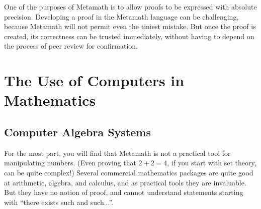 One of the purposes of Metamath is to allow proofs to be
expressed with absolute precision.  Developing a proof in the Metamath
language can be challenging, because Metamath will not permit even the
tiniest mistake.  But once the proof is created, its
correctness can be trusted immediately, without having to depend on the
process of peer review for confirmation.

\section{The Use of Computers in Mathematics}

\subsection{Computer Algebra Systems}

For the most part, you will find that Metamath is not a
practical tool for manipulating numbers.  (Even proving that $2 + 2 = 4$, if
you start with set theory, can be quite complex!)  Several commercial
mathematics packages are quite good at arithmetic, algebra, and calculus, and
as practical tools they are invaluable. But
they have no notion of proof, and cannot understand statements starting with
``there exists such and such...''.


